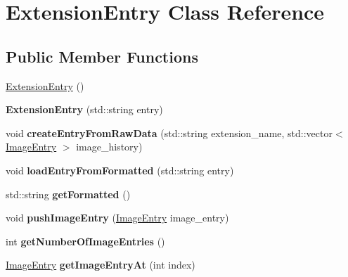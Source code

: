 \hypertarget{class_extension_entry}{}\section{Extension\+Entry Class Reference}
\label{class_extension_entry}
\subsection*{Public Member Functions}
\begin{DoxyCompactItemize}
\item 
\hyperlink{class_extension_entry_a614b16ce172c8b81e0a127f61188152f}{Extension\+Entry} ()
\item 
\hypertarget{class_extension_entry_ac4454892358b61f11f095113e2da2ab7}{}{\bfseries Extension\+Entry} (std\+::string entry)\label{class_extension_entry_ac4454892358b61f11f095113e2da2ab7}

\item 
\hypertarget{class_extension_entry_ae550ab47783464b47313e82a9db0db90}{}void {\bfseries create\+Entry\+From\+Raw\+Data} (std\+::string extension\+\_\+name, std\+::vector$<$ \hyperlink{class_image_entry}{Image\+Entry} $>$ image\+\_\+history)\label{class_extension_entry_ae550ab47783464b47313e82a9db0db90}

\item 
\hypertarget{class_extension_entry_ad8c83e5374f51d16e6e47df1358b4ce2}{}void {\bfseries load\+Entry\+From\+Formatted} (std\+::string entry)\label{class_extension_entry_ad8c83e5374f51d16e6e47df1358b4ce2}

\item 
\hypertarget{class_extension_entry_ae42007cdd2857322ec451f154ff1be60}{}std\+::string {\bfseries get\+Formatted} ()\label{class_extension_entry_ae42007cdd2857322ec451f154ff1be60}

\item 
\hypertarget{class_extension_entry_ae56ccf8d17b885f92ef99de9d9bbcb1b}{}void {\bfseries push\+Image\+Entry} (\hyperlink{class_image_entry}{Image\+Entry} image\+\_\+entry)\label{class_extension_entry_ae56ccf8d17b885f92ef99de9d9bbcb1b}

\item 
\hypertarget{class_extension_entry_a24093ee69d65161886b5ff00332352e3}{}int {\bfseries get\+Number\+Of\+Image\+Entries} ()\label{class_extension_entry_a24093ee69d65161886b5ff00332352e3}

\item 
\hypertarget{class_extension_entry_a9b6e025c72aba2330224b822446182c6}{}\hyperlink{class_image_entry}{Image\+Entry} {\bfseries get\+Image\+Entry\+At} (int index)\label{class_extension_entry_a9b6e025c72aba2330224b822446182c6}

\end{DoxyCompactItemize}


